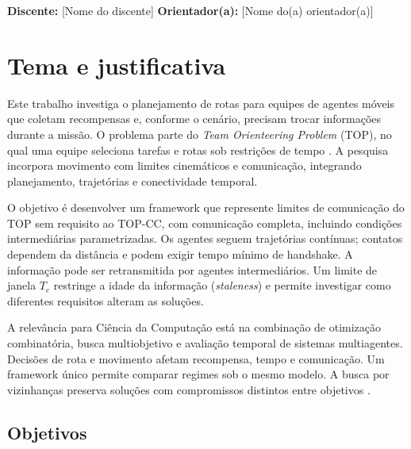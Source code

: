 \documentclass[mscproposta,portugues]{ppgccufmg}
\begin{document}
\maketitle
\noindent\textbf{Discente:} [Nome do discente]\hfill
\textbf{Orientador(a):} [Nome do(a) orientador(a)]\par
\vspace{0.4cm}
\setbeforechapskip{0pt}
\setafterchapskip{0.6cm}
\setbeforesecskip{0.5cm}
\setaftersecskip{0.2cm}

\section{Tema e justificativa}

Este trabalho investiga o planejamento de rotas para equipes de agentes móveis que coletam recompensas e, conforme o cenário, precisam trocar informações durante a missão. O problema parte do \textit{Team Orienteering Problem} (TOP), no qual uma equipe seleciona tarefas e rotas sob restrições de tempo \citep{chao1996team,gunawan2016survey}. A pesquisa incorpora movimento com limites cinemáticos e comunicação, integrando planejamento, trajetórias e conectividade temporal.

O objetivo é desenvolver um framework que represente limites de comunicação do TOP sem requisito ao TOP-CC, com comunicação completa, incluindo condições intermediárias parametrizadas. Os agentes seguem trajetórias contínuas; contatos dependem da distância e podem exigir tempo mínimo de handshake. A informação pode ser retransmitida por agentes intermediários. Um limite de janela $T_c$ restringe a idade da informação (\textit{staleness}) e permite investigar como diferentes requisitos alteram as soluções.

A relevância para Ciência da Computação está na combinação de otimização combinatória, busca multiobjetivo e avaliação temporal de sistemas multiagentes. Decisões de rota e movimento afetam recompensa, tempo e comunicação. Um framework único permite comparar regimes sob o mesmo modelo. A busca por vizinhanças preserva soluções com compromissos distintos entre objetivos \citep{duarte2015movns}.

\subsection{Objetivos}
\end{document}
